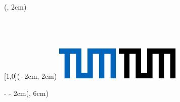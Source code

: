 \begin{titlepage}

\begin{textblock*}{\textwidth}(\coverborderleft, 2cm)%
    	\setlength{\baselineskip}{11pt}%
    	\ifx \monochromeCover \undefined
        	\textcolor{UniversitaetFarbe} { %
        	\fontsize{9}{11}\selectfont%
        	\sffamily \chair\\%
        	\sffamily \faculty\\%
        	\sffamily \uni }
        \else
        	\textcolor{black} { %
        	\fontsize{9}{11}\selectfont%
        	\sffamily \chair\\%
        	\sffamily \faculty\\%
        	\sffamily \uni }
        \fi
\end{textblock*}%

\begin{textblock*}{\UniversitaetLogoBreite}[1,0](\paperwidth - 2cm, 2cm)%
		\ifx \monochromeCover \undefined
        	\includegraphics{images/TUM_Logos/TUM_blau.pdf}%
        \else
        	\includegraphics{images/TUM_Logos/TUM_schwarz.pdf}%
        \fi
\end{textblock*}%

\begin{textblock*}{\paperwidth - \coverborderleft - 2cm}(\coverborderleft , 6cm)%
\raggedright %
{\sffamily \Large \worktype}\\
{\sffamily \huge \titleFirstLanguage \par} %
~\\
\sffamily \Large \textbf{\authorname}\\
\end{textblock*}

~\\ %
\end{titlepage}